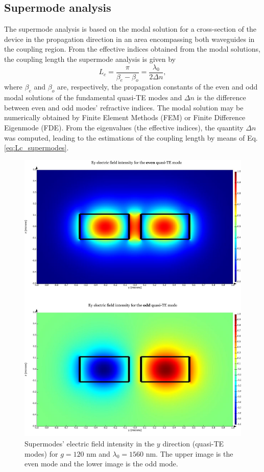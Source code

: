 \documentclass[conference]{IEEEtran}
\begin{document}
\subsection{Supermode analysis}

The supermode analysis is based on the modal solution for a cross-section of the device in the propagation direction in an area encompassing both waveguides in the coupling region. From the effective indices obtained from the modal solutions, the coupling length  the supermode analysis is given by\cite{okamoto}
\begin{equation}
    L_c = \dfrac{\pi}{\beta_e - \beta_o} = \dfrac{\lambda_0}{2\Delta n},
\label{eq:Lc_supermodes}
\end{equation}
where $\beta_e$ and $\beta_o$ are, respectively, the propagation constants of the even and odd modal solutions of the fundamental quasi-TE modes and $\Delta n$ is the difference between even and odd modes' refractive indices. The modal solution may be numerically obtained by Finite Element Methods (FEM) or Finite Difference Eigenmode (FDE). From the eigenvalues (the effective indices), the quantity $\Delta n$ was computed, leading to the estimations of the coupling length by means of Eq. \ref{eq:Lc_supermodes}.


\begin{figure}[ht]
\centerline{\includegraphics[width=0.9\linewidth]{projeto2/figs/supermodes_even_odd_gap120nm_1560nm.pdf}}
\caption{Supermodes' electric field intensity in the $y$ direction (quasi-TE modes) for $g=120$ nm and $\lambda_0 = 1560$ nm. The upper image is the even mode and the lower image is the odd mode.}
\label{fig:supermodes}
\end{figure}
\end{document}
